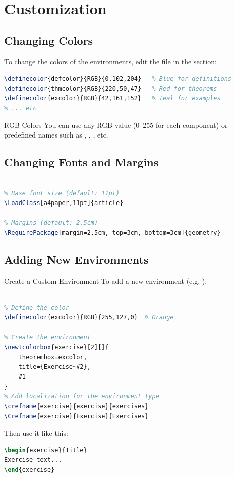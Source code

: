 \documentclass[]{csnotes}
\begin{document}
\section{Customization}

\subsection{Changing Colors}

To change the colors of the environments, edit the file 
in the  section:

\begin{lstlisting}[language=TeX]
% In csnotes.cls
\definecolor{defcolor}{RGB}{0,102,204}   % Blue for definitions
\definecolor{thmcolor}{RGB}{220,50,47}   % Red for theorems
\definecolor{excolor}{RGB}{42,161,152}   % Teal for examples
% ... etc
\end{lstlisting}

\begin{note}{RGB Colors}
You can use any RGB value (0--255 for each component) or predefined names such as
, , , etc.
\end{note}

\subsection{Changing Fonts and Margins}

\begin{lstlisting}[language=TeX]
% In csnotes.cls

% Base font size (default: 11pt)
\LoadClass[a4paper,11pt]{article}

% Margins (default: 2.5cm)
\RequirePackage[margin=2.5cm, top=3cm, bottom=3cm]{geometry}
\end{lstlisting}

\subsection{Adding New Environments}

\begin{example}{Create a Custom Environment}
To add a new environment (e.g. ):
\begin{lstlisting}[language=TeX]
% In csnotes.cls, after the other environments

% Define the color
\definecolor{excolor}{RGB}{255,127,0}  % Orange

% Create the environment
\newtcolorbox{exercise}[2][]{
    theorembox=excolor,
    title={Exercise~#2},
    #1
}
% Add localization for the environment type
\crefname{exercise}{exercise}{exercises}
\Crefname{exercise}{Exercise}{Exercises}
\end{lstlisting}

Then use it like this:
\begin{lstlisting}[language=TeX]
\begin{exercise}{Title}
Exercise text...
\end{exercise}
\end{lstlisting}
\end{example}
\end{document}
